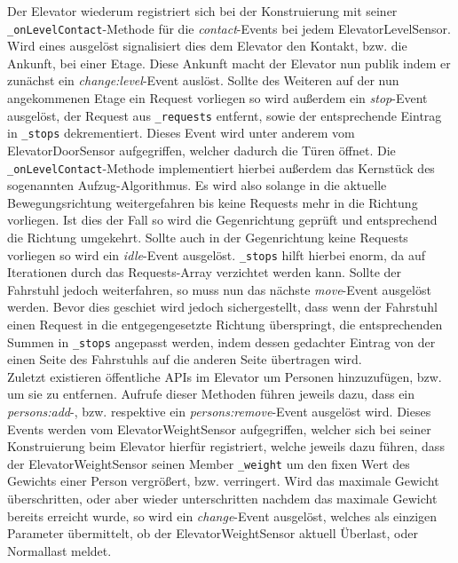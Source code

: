 Der Elevator wiederum registriert sich bei der Konstruierung mit seiner \texttt{_onLevelContact}-Methode für die \textit{contact}-Events bei jedem ElevatorLevelSensor.
Wird eines ausgelöst signalisiert dies dem Elevator den Kontakt, bzw. die Ankunft, bei einer Etage.
Diese Ankunft macht der Elevator nun publik indem er zunächst ein \textit{change:level}-Event auslöst.
Sollte des Weiteren auf der nun angekommenen Etage ein Request vorliegen so wird außerdem ein \textit{stop}-Event ausgelöst, der Request aus \texttt{_requests} entfernt, sowie der entsprechende Eintrag in \texttt{_stops} dekrementiert.
Dieses Event wird unter anderem vom ElevatorDoorSensor aufgegriffen, welcher dadurch die Türen öffnet.
Die \texttt{_onLevelContact}-Methode implementiert hierbei außerdem das Kernstück des sogenannten Aufzug-Algorithmus.
Es wird also solange in die aktuelle Bewegungsrichtung weitergefahren bis keine Requests mehr in die Richtung vorliegen.
Ist dies der Fall so wird die Gegenrichtung geprüft und entsprechend die Richtung umgekehrt.
Sollte auch in der Gegenrichtung keine Requests vorliegen so wird ein \textit{idle}-Event ausgelöst.
\texttt{_stops} hilft hierbei enorm, da auf Iterationen durch das Requests-Array verzichtet werden kann.
Sollte der Fahrstuhl jedoch weiterfahren, so muss nun das nächste \textit{move}-Event ausgelöst werden.
Bevor dies geschiet wird jedoch sichergestellt, dass wenn der Fahrstuhl einen Request in die entgegengesetzte Richtung überspringt, die entsprechenden Summen in \texttt{_stops} angepasst werden, indem dessen gedachter Eintrag von der einen Seite des Fahrstuhls auf die anderen Seite übertragen wird. \\

Zuletzt existieren öffentliche APIs im Elevator um Personen hinzuzufügen, bzw. um sie zu entfernen.
Aufrufe dieser Methoden führen jeweils dazu, dass ein \textit{persons:add}-, bzw. respektive ein \textit{persons:remove}-Event ausgelöst wird.
Dieses Events werden vom ElevatorWeightSensor aufgegriffen, welcher sich bei seiner Konstruierung beim Elevator hierfür registriert, welche jeweils dazu führen, dass der ElevatorWeightSensor seinen Member \texttt{_weight} um den fixen Wert des Gewichts einer Person vergrößert, bzw. verringert.
Wird das maximale Gewicht überschritten, oder aber wieder unterschritten nachdem das maximale Gewicht bereits erreicht wurde, so wird ein \textit{change}-Event ausgelöst, welches als einzigen Parameter übermittelt, ob der ElevatorWeightSensor aktuell Überlast, oder Normallast meldet. \\

